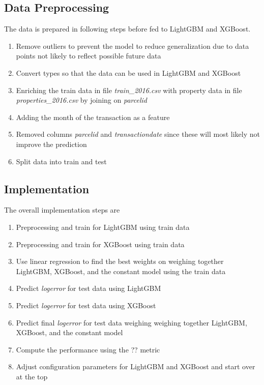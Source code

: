\documentclass[a4paper]{article}
\begin{document}
\subsection{Data Preprocessing}
The data is prepared in following steps before fed to LightGBM and XGBoost.
\begin{enumerate}
    \item Remove outliers to prevent the model to reduce generalization due to data points not likely to
        reflect possible future data
    \item Convert types so that the data can be used in LightGBM and XGBoost
    \item Enriching the train data in file \textit{train\_2016.csv} with property data in file
        \textit{properties\_2016.csv} by joining on \textit{parcelid}
    \item Adding the month of the transaction as a feature
    \item Removed columns \textit{parcelid} and \textit{transactiondate} since these will most likely not
        improve the prediction
    \item Split data into train and test
\end{enumerate}

\subsection{Implementation}
The overall implementation steps are
\begin{enumerate}
    \item Preprocessing and train for LightGBM using train data
    \item Preprocessing and train for XGBoost using train data
    \item Use linear regression to find the best weights on weighing together LightGBM, XGBoost, and the constant
        model using the train data
    \item Predict \textit{logerror} for test data using LightGBM
    \item Predict \textit{logerror} for test data using XGBoost
    \item Predict final \textit{logerror} for test data weighing weighing together LightGBM, XGBoost, and the
        constant model
    \item Compute the performance using the ?? metric
    \item Adjust configuration parameters for LightGBM and XGBoost and start over at the top
\end{enumerate}
\end{document}
